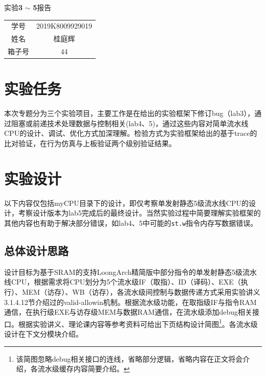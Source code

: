 \documentclass[UTF-8,twoside,c5size]{ctexart}
\begin{document}
	\begin{center}
		\heiti{}
		实验\textbf{3} $ \bm\sim $ \textbf{5}报告
	\end{center}

	\begin{table}[!h]
		\raggedleft
		\begin{tabular}{cc}
			{\heiti 学号} & {2019K8009929019} \\
			{\heiti 姓名} & 桂庭辉 \\
			{\heiti 箱子号} & 44
		\end{tabular}
	\end{table}
	
	\section{实验任务}
	本次专题分为三个实验项目，主要工作是在给出的实验框架下修订bug（lab3），通过阻塞或前递技术处理数据与控制相关(lab4、5)，通过这些内容对简单流水线CPU的设计、调试、优化方式加深理解。检验方式为实验框架给出的基于trace的比对验证，在行为仿真与上板验证两个级别验证结果。
	
	\section{实验设计}
	
	以下内容仅包括myCPU目录下的设计，即仅考察单发射静态5级流水线CPU的设计，考察设计版本为lab5完成后的最终设计。当然实验过程中简要理解实验框架的其他内容也有助于解决部分错误，如lab4、5中可能的\texttt{st.w}指令内存写数据错误。
	
	\subsection{总体设计思路}
	
	设计目标为基于SRAM的支持LoongArch精简版中部分指令的单发射静态5级流水线CPU，根据需求将CPU划分为5个流水级IF（取指）、ID（译码）、EXE（执行）、MEM（访存）、WB（访存），各流水级间控制与数据传递方式采用实验讲义3.1.4.12节介绍过的valid-allowin机制。根据流水级功能，在取指级IF与指令RAM通信，在执行级EXE与访存级MEM与数据RAM通信，在流水级添加debug相关接口。根据实验讲义、理论课内容等参考资料可给出下页结构设计简图\footnote{该简图忽略debug相关接口的连线，省略部分逻辑，省略内容在正文将会介绍，各流水级缓存内容简要介绍。}。各流水级设计在下文分模块介绍。
	
\end{document}
